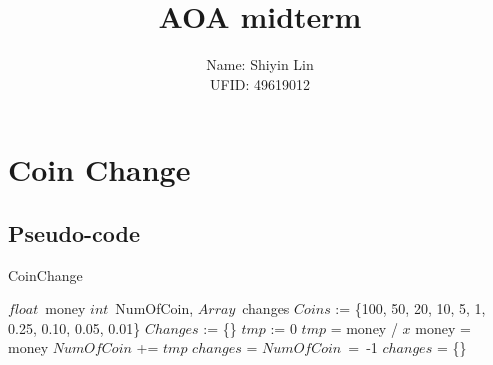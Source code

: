 \documentclass{article}
\title{AOA midterm}
\author{Name: Shiyin Lin \\UFID: 49619012}
\date{}
\begin{document}
\maketitle

\section{Coin Change}
\subsection{Pseudo-code}
\begin{algorithm}
    \caption{CoinChange}
    \begin{algorithmic}[1] 
        \Require $float$\ money  
        \Ensure $int$\ NumOfCoin, $Array$\ changes
            \State $Coins$ := \{100, 50, 20, 10, 5, 1, 0.25, 0.10, 0.05, 0.01\}
            \State $Changes$ := \{\}
                    \State $tmp$ := 0
                    \State $tmp$ = money / $x$
                    \State money = money %
                    \State $NumOfCoin$ += $tmp$
                    \State $changes$ = 
                \EndWhile
            \EndFor
                \State $NumOfCoin$\ =\ -1
                \State $changes$ = \{\}
                \State {}
            \EndIf
            \State {}
        \EndFunction
    \end{algorithmic}  
\end{algorithm} 
\clearpage
\end{document}
